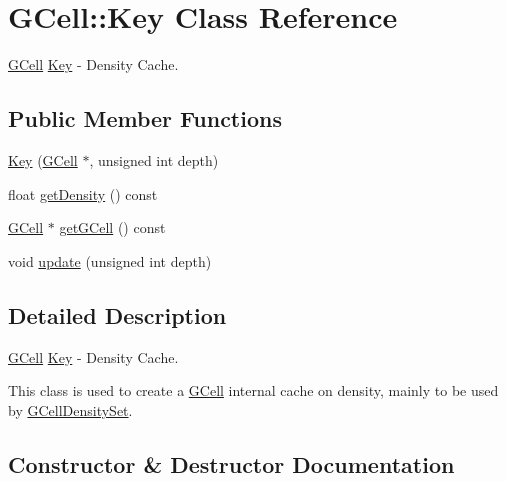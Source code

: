 \hypertarget{classKatabatic_1_1GCell_1_1Key}{}\section{G\+Cell\+:\+:Key Class Reference}
\label{classKatabatic_1_1GCell_1_1Key}


\hyperlink{classKatabatic_1_1GCell}{G\+Cell} \hyperlink{classKatabatic_1_1GCell_1_1Key}{Key} -\/ Density Cache.  


\subsection*{Public Member Functions}
\begin{DoxyCompactItemize}
\item 
\hyperlink{classKatabatic_1_1GCell_1_1Key_a6efdb05badcc81d3d3013ce4730bbe6e}{Key} (\hyperlink{classKatabatic_1_1GCell}{G\+Cell} $\ast$, unsigned int depth)
\item 
float \hyperlink{classKatabatic_1_1GCell_1_1Key_a9f45c741b4c738e833fe66fe125592b7}{get\+Density} () const
\item 
\hyperlink{classKatabatic_1_1GCell}{G\+Cell} $\ast$ \hyperlink{classKatabatic_1_1GCell_1_1Key_a819cf639562a031a1e2e061fe1293d66}{get\+G\+Cell} () const
\item 
void \hyperlink{classKatabatic_1_1GCell_1_1Key_a1b9cfb06a645d2b0d93024bc6ff82e9e}{update} (unsigned int depth)
\end{DoxyCompactItemize}


\subsection{Detailed Description}
\hyperlink{classKatabatic_1_1GCell}{G\+Cell} \hyperlink{classKatabatic_1_1GCell_1_1Key}{Key} -\/ Density Cache. 

This class is used to create a \hyperlink{classKatabatic_1_1GCell}{G\+Cell} internal cache on density, mainly to be used by \hyperlink{classKatabatic_1_1GCellDensitySet}{G\+Cell\+Density\+Set}. 

\subsection{Constructor \& Destructor Documentation}
\mbox{\label{classKatabatic_1_1GCell_1_1Key_a6efdb05badcc81d3d3013ce4730bbe6e}} 
